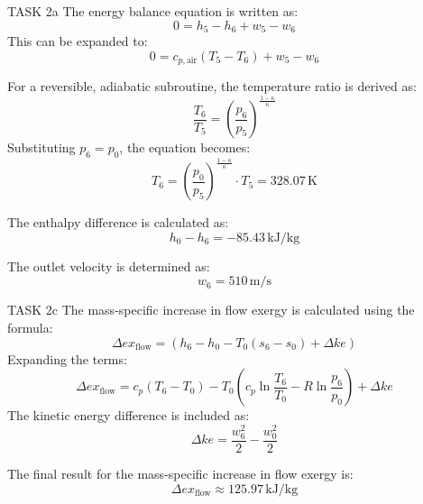 TASK 2a  
The energy balance equation is written as:  
\[
0 = h_5 - h_6 + w_5 - w_6
\]  
This can be expanded to:  
\[
0 = c_{p,\text{air}} (T_5 - T_6) + w_5 - w_6
\]  

For a reversible, adiabatic subroutine, the temperature ratio is derived as:  
\[
\frac{T_6}{T_5} = \left( \frac{p_6}{p_5} \right)^{\frac{1 - \kappa}{\kappa}}
\]  
Substituting \( p_6 = p_0 \), the equation becomes:  
\[
T_6 = \left( \frac{p_0}{p_5} \right)^{\frac{1 - \kappa}{\kappa}} \cdot T_5 = 328.07 \, \text{K}
\]  

The enthalpy difference is calculated as:  
\[
h_0 - h_6 = -85.43 \, \text{kJ/kg}
\]  

The outlet velocity is determined as:  
\[
w_6 = 510 \, \text{m/s}
\]  

TASK 2c  
The mass-specific increase in flow exergy is calculated using the formula:  
\[
\Delta ex_{\text{flow}} = (h_6 - h_0 - T_0 (s_6 - s_0) + \Delta ke)
\]  
Expanding the terms:  
\[
\Delta ex_{\text{flow}} = c_p (T_6 - T_0) - T_0 \left( c_p \ln \frac{T_6}{T_0} - R \ln \frac{p_6}{p_0} \right) + \Delta ke
\]  
The kinetic energy difference is included as:  
\[
\Delta ke = \frac{w_6^2}{2} - \frac{w_0^2}{2}
\]  

The final result for the mass-specific increase in flow exergy is:  
\[
\Delta ex_{\text{flow}} \approx 125.97 \, \text{kJ/kg}
\]